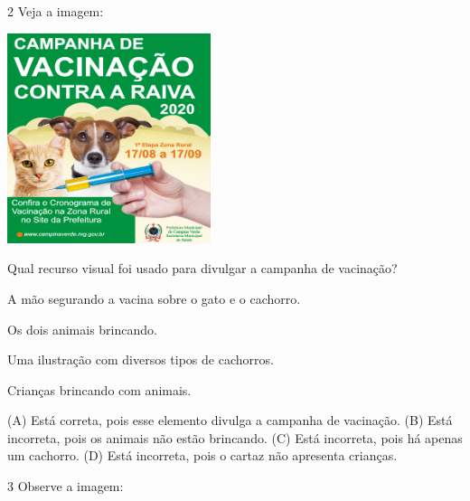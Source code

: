 \num{2} Veja a imagem:

\includegraphics[width=2.34507in,height=2.41801in]{media/image137.png}


Qual recurso visual foi usado para divulgar a campanha de vacinação?

\begin{minipage}{.5\textwidth}
\begin{escolha}
\item A mão segurando a vacina sobre o gato e o cachorro.

\item Os dois animais brincando.

\item Uma ilustração com diversos tipos de cachorros.

\item Crianças brincando com animais.
\end{escolha}
\end{minipage}

(A) Está correta, pois esse elemento divulga a campanha de vacinação.
(B) Está incorreta, pois os animais não estão brincando.
(C) Está incorreta, pois há apenas um cachorro.
(D) Está incorreta, pois o cartaz não apresenta crianças.

\num{3} Observe a imagem:


